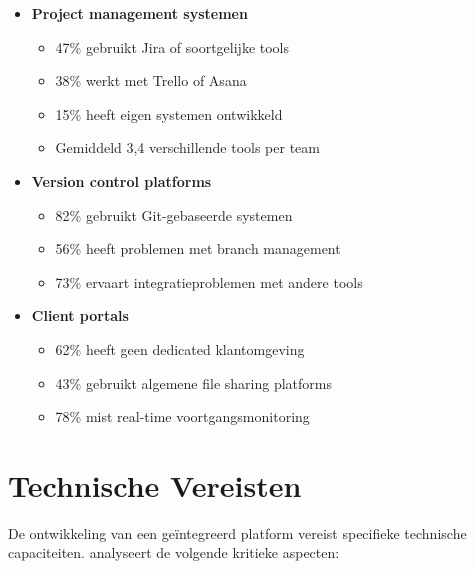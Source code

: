 \begin{itemize}
    \item \textbf{Project management systemen}
    \begin{itemize}
        \item 47\% gebruikt Jira of soortgelijke tools
        \item 38\% werkt met Trello of Asana
        \item 15\% heeft eigen systemen ontwikkeld
        \item Gemiddeld 3,4 verschillende tools per team
    \end{itemize}
    
    \item \textbf{Version control platforms}
    \begin{itemize}
        \item 82\% gebruikt Git-gebaseerde systemen
        \item 56\% heeft problemen met branch management
        \item 73\% ervaart integratieproblemen met andere tools
    \end{itemize}
    
    \item \textbf{Client portals}
    \begin{itemize}
        \item 62\% heeft geen dedicated klantomgeving
        \item 43\% gebruikt algemene file sharing platforms
        \item 78\% mist real-time voortgangsmonitoring
    \end{itemize}
\end{itemize}

\section{Technische Vereisten}
\label{sec:technische-vereisten}

De ontwikkeling van een geïntegreerd platform vereist specifieke technische capaciteiten. \textcite{Thompson2024} analyseert de volgende kritieke aspecten:


